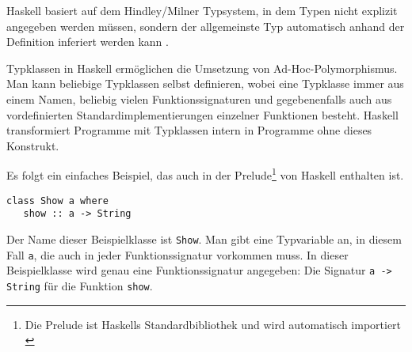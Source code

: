 Haskell basiert auf dem Hindley/Milner Typsystem, in dem Typen nicht explizit angegeben werden müssen, sondern der allgemeinste
Typ automatisch anhand der Definition inferiert werden kann \cite{wadler}.






Typklassen in Haskell ermöglichen die Umsetzung von Ad-Hoc-Polymorphismus.  Man kann beliebige Typklassen selbst definieren,
wobei eine Typklasse immer aus einem Namen, beliebig vielen Funktionssignaturen und gegebenenfalls auch aus vordefinierten
Standardimplementierungen einzelner Funktionen besteht. Haskell transformiert Programme mit Typklassen intern in Programme
ohne dieses Konstrukt. 

Es folgt ein einfaches Beispiel, das auch in der Prelude\footnote{Die Prelude ist Haskells Standardbibliothek und wird automatisch importiert \cite{haskell}} von Haskell enthalten ist.


\begin{verbatim}
class Show a where
   show :: a -> String
\end{verbatim}

Der Name dieser Beispielklasse ist \texttt{Show}. Man gibt eine Typvariable an, in diesem Fall \texttt{a}, die auch in jeder
Funktionssignatur vorkommen muss. In dieser Beispielklasse wird genau eine Funktionssignatur angegeben: Die Signatur
\texttt{a -> String} für die Funktion \texttt{show}.

